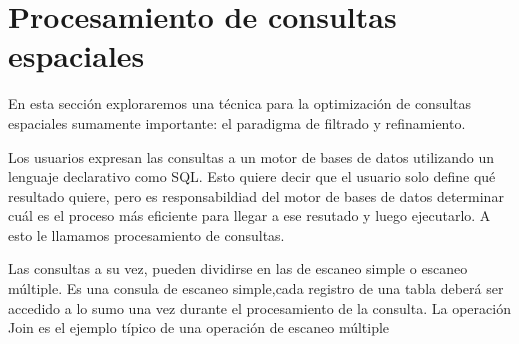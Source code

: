 
\section{Procesamiento de consultas espaciales}

En esta sección exploraremos una técnica para la optimización de consultas espaciales sumamente importante:
el paradigma de filtrado y refinamiento.

Los usuarios expresan las consultas a un motor de bases de datos utilizando un lenguaje declarativo como SQL.
Esto quiere decir que el usuario solo define qué resultado quiere, pero es responsabildiad del motor de bases de datos
determinar cuál es el proceso más eficiente para llegar a ese resutado y luego ejecutarlo. A esto le llamamos procesamiento de consultas.

Las consultas a su vez, pueden dividirse en las de escaneo simple o escaneo múltiple.
Es una consula de escaneo simple,cada registro de una tabla deberá ser accedido a lo sumo una vez durante el procesamiento de la consulta.
La operación Join es el ejemplo típico de una operación de escaneo múltiple